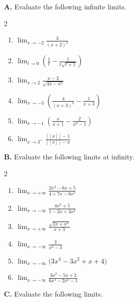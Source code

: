 \raggedcolumns
\setlength{\columnsep}{1.5em}

\medskip
\noindent\textbf{A.} Evaluate the following infinite limits.

\begin{multicols}{2}
\begin{enumerate}[label=\arabic*., nosep, topsep=0pt, itemsep=2pt]
    \item \(\displaystyle\lim_{x \to -2} \frac{3}{(x + 2)^{2}}\)
    \item \(\displaystyle\lim_{t \to 0} \left( \frac{1}{t} - \frac{1}{t\sqrt{t + 1}} \right)\)
    \item \(\displaystyle\lim_{x \to 2} \frac{x - 2}{\sqrt{4x - x^{2}}}\)
    \item \(\displaystyle\lim_{x \to -3} \left( \frac{4}{(x + 3)^{2}} - \frac{1}{x + 3} \right)\)
    \item \(\displaystyle\lim_{x \to -1} \left( \frac{x}{x + 1} - \frac{2}{x^{2} - 1} \right)\)
    \item \(\displaystyle\lim_{x \to 3^{+}} \frac{[\![x]\!] - 1}{[\![x]\!] - x}\)
\end{enumerate}
\end{multicols}

\medskip
\noindent\textbf{B.} Evaluate the following limits at infinity.

\begin{multicols}{2}
\begin{enumerate}[label=\arabic*., nosep, topsep=0pt, itemsep=2pt]
    \item \(\displaystyle\lim_{x \to +\infty} \frac{2x^{3} - 6x + 5}{4 + 7x - 6x^{3}}\)
    \item \(\displaystyle\lim_{x \to -\infty} \frac{4x^{3} + 5}{1 - 2x + 3x^{2}}\)
    \item \(\displaystyle\lim_{x \to +\infty} \frac{\sqrt{2x + x^{2}}}{x + 3}\)
    \item \(\displaystyle\lim_{x \to -\infty} \frac{3}{x^{2} - 3}\)
    \item \(\displaystyle\lim_{x \to -\infty} \bigl(3x^{4} - 3x^{2} + x + 4\bigr)\)
    \item \(\displaystyle\lim_{x \to -\infty} \frac{3x^{2} - 5x + 2}{6x^{3} - 2x^{2} - 1}\)
\end{enumerate}
\end{multicols}

\medskip
\noindent\textbf{C.} Evaluate the following limits.

